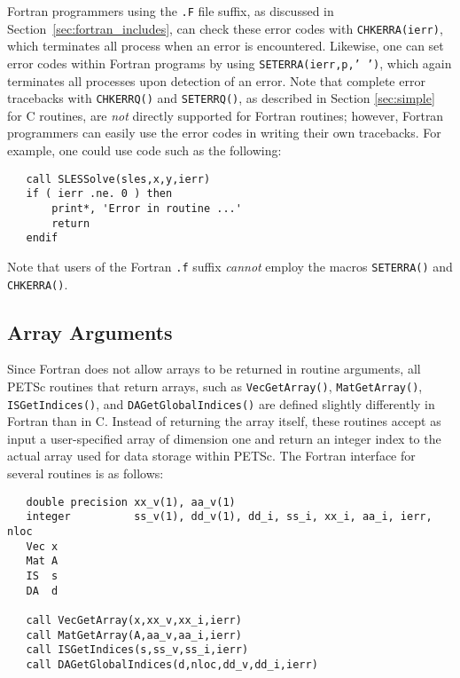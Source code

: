 Fortran programmers using the {\tt .F} file suffix, as discussed in
Section~\ref{sec:fortran_includes}, can check these error codes with
{\tt CHKERRA(ierr)}, which terminates all process when an error is
encountered.  Likewise, one can set error codes within Fortran programs by
using {\tt SETERRA(ierr,p,' ')}, which again terminates all processes
upon detection of an error.  
Note that complete error tracebacks with
{\tt CHKERRQ()} and {\tt SETERRQ()}, as described in Section
\ref{sec:simple} for C routines, are {\em not} directly supported for
Fortran routines; however, Fortran programmers can easily use the
error codes in writing their own tracebacks.  For example, one could
use code such as the following:
\begin{verbatim}
   call SLESSolve(sles,x,y,ierr)
   if ( ierr .ne. 0 ) then
       print*, 'Error in routine ...'
       return
   endif
\end{verbatim}
Note that users of the Fortran {\tt .f} suffix {\em cannot} employ the
macros {\tt SETERRA()} and {\tt CHKERRA()}.

\subsection{Array Arguments}
\label{sec:fortran_arrays}

Since Fortran does not allow arrays to be returned in routine
arguments, all PETSc routines that return arrays, such as 
{\tt VecGetArray()}, {\tt MatGetArray()}, 
{\tt ISGetIndices()}, and {\tt DAGetGlobalIndices()}
are defined slightly differently in Fortran than in C.  
  
 
Instead of returning the array itself, these routines
accept as input a user-specified array of dimension one and return an
integer index to the actual array used for data storage within PETSc.
The Fortran interface for several routines is as follows:
\begin{verbatim}
   double precision xx_v(1), aa_v(1)
   integer          ss_v(1), dd_v(1), dd_i, ss_i, xx_i, aa_i, ierr, nloc
   Vec x
   Mat A
   IS  s
   DA  d

   call VecGetArray(x,xx_v,xx_i,ierr)
   call MatGetArray(A,aa_v,aa_i,ierr)
   call ISGetIndices(s,ss_v,ss_i,ierr)
   call DAGetGlobalIndices(d,nloc,dd_v,dd_i,ierr)
\end{verbatim}

